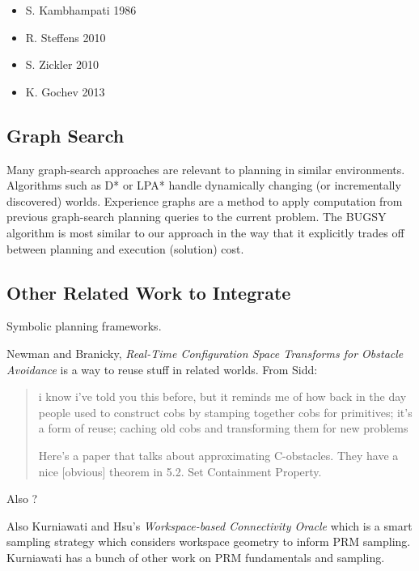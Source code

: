 \documentclass{report}
\begin{document}
\noindent
\begin{itemize}
\item S. Kambhampati 1986
\item R. Steffens 2010
\item S. Zickler 2010
\item K. Gochev 2013
\end{itemize}

\subsection{Graph Search}

Many graph-search approaches are relevant to planning in similar
environments.
Algorithms such as
D* \cite{stentz1994dstar}
or LPA* \cite{koenig2004lpastar}
handle dynamically changing (or incrementally discovered) worlds.
Experience graphs \cite{phillips2012egraphs} are a method to apply
computation from previous graph-search planning queries
to the current problem.
The \textsc{BUGSY} algorithm \cite{ruml2007bugsy}
is most similar to our approach in the way that it explicitly
trades off between planning and execution (solution) cost.

\subsection{Other Related Work to Integrate}

Symbolic planning frameworks.

Newman and Branicky,
\emph{Real-Time Configuration Space Transforms for Obstacle Avoidance}
\cite{newmanbranicky1991cspacetransforms}
is a way to reuse stuff in related worlds.
From Sidd:
\begin{quote}
i know i've told you this before,
but it reminds me of how back in the day
people used to construct cobs
by stamping together cobs for primitives;
it's a form of reuse;
caching old cobs and transforming them for new problems

Here's a paper that talks about approximating C-obstacles.
They have a nice [obvious] theorem in 5.2. Set Containment Property.
\end{quote}

Also \cite{kavraki1995cspacefft}?

Also Kurniawati and Hsu's
\emph{Workspace-based Connectivity Oracle}
\cite{kurniawati2008workconnoracle}
which is a smart sampling strategy which considers workspace
geometry to inform PRM sampling.
Kurniawati has a bunch of other work on PRM fundamentals and sampling.
\end{document}
